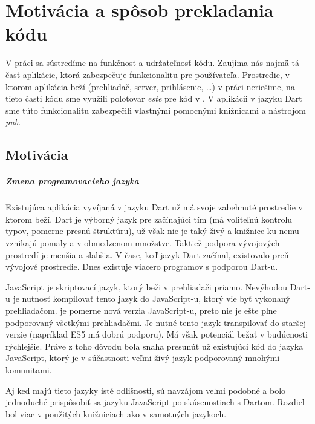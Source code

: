 \chapter{Motivácia a spôsob prekladania kódu}%
V práci sa sústredíme na funkčnosť a udržateľnosť kódu. Zaujíma nás najmä tá časť aplikácie, ktorá zabezpečuje funkcionalitu pre používateľa. Prostredie, v ktorom aplikácia beží (prehliadač, server, prihlásenie, \ldots) v práci neriešime, na tieto časti kódu sme využili polotovar %
\emph{este} \cite{Este} pre kód v \JS{}. 
V aplikácii v jazyku Dart sme túto funkcionalitu zabezpečili vlastnými pomocnými knižnicami a nástrojom \emph{pub}.

\section{Motivácia}
\paragraph{Zmena programovacieho jazyka}
Existujúca aplikácia vyvíjaná v jazyku Dart už má svoje zabehnuté prostredie v ktorom beží. Dart je výborný jazyk pre začínajúci tím (má voliteľnú kontrolu typov, pomerne presnú štruktúru), už však nie je taký živý a knižnice ku nemu vznikajú pomaly a v obmedzenom množstve. 
Taktiež podpora vývojových prostredí je menšia a slabšia. V čase, keď jazyk Dart začínal, existovalo preň vývojové prostredie. Dnes existuje viacero programov s podporou Dart-u. 

JavaScript je skriptovací jazyk, ktorý beži v prehliadači priamo. Nevýhodou Dart-u je nutnosť kompilovať tento jazyk do JavaScript-u, ktorý vie byť vykonaný prehliadačom. \JS{} je pomerne nová verzia JavaScript-u, preto nie je ešte plne podporovaný všetkými prehliadačmi. Je nutné tento jazyk transpilovať do staršej verzie (napríklad ES5 má dobrú podporu). Má však potenciál bežať v budúcnosti rýchlejšie.
Práve z toho dôvodu bola snaha presunúť už existujúci kód do jazyka JavaScript, ktorý je v súčastnosti veľmi živý jazyk podporovaný mnohými komunitami. 

Aj keď majú tieto jazyky isté odlišnosti, sú navzájom veľmi podobné a bolo jednoduché prispôsobiť sa jazyku JavaScript po skúsenostiach s Dartom.
Rozdiel bol viac v použitých knižniciach ako v samotných jazykoch.

